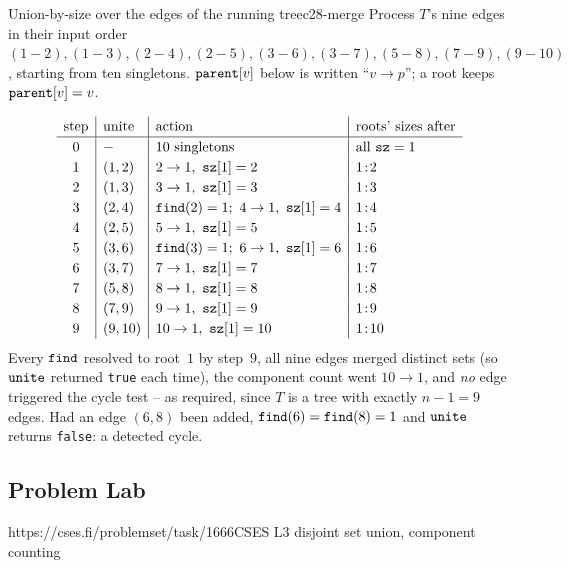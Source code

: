 \begin{example}{Union-by-size over the edges of the running tree}{c28-merge}
Process \(T\)'s nine edges in their input order
\((1\!-\!2),(1\!-\!3),(2\!-\!4),(2\!-\!5),(3\!-\!6),(3\!-\!7),(5\!-\!8),
(7\!-\!9),(9\!-\!10)\), starting from ten singletons.  \(\texttt{parent}[v]\)
below is written ``\(v\!\to\!p\)''; a root keeps \(\texttt{parent}[v]=v\).
\end{example}
\begin{tracebox}
\[
\renewcommand{\arraystretch}{1.2}
\begin{array}{c|l|l|l}
\text{step} & \text{unite} & \text{action} & \text{roots' sizes after} \\ \hline
0 & - & 10\text{ singletons} & \text{all } \code{sz}=1\\
1 & (1,2) & 2\to1,\ \code{sz}[1]=2 & 1\!:\!2\\
2 & (1,3) & 3\to1,\ \code{sz}[1]=3 & 1\!:\!3\\
3 & (2,4) & \code{find}(2)=1;\ 4\to1,\ \code{sz}[1]=4 & 1\!:\!4\\
4 & (2,5) & 5\to1,\ \code{sz}[1]=5 & 1\!:\!5\\
5 & (3,6) & \code{find}(3)=1;\ 6\to1,\ \code{sz}[1]=6 & 1\!:\!6\\
6 & (3,7) & 7\to1,\ \code{sz}[1]=7 & 1\!:\!7\\
7 & (5,8) & 8\to1,\ \code{sz}[1]=8 & 1\!:\!8\\
8 & (7,9) & 9\to1,\ \code{sz}[1]=9 & 1\!:\!9\\
9 & (9,10) & 10\to1,\ \code{sz}[1]=10 & 1\!:\!10
\end{array}
\]
Every \(\texttt{find}\) resolved to root~\(1\) by step~9, all nine edges merged
distinct sets (so \(\texttt{unite}\) returned \texttt{true} each time), the
component count went \(10\to1\), and \emph{no} edge triggered the cycle test
-- as required, since \(T\) is a tree with exactly \(n-1=9\) edges.  Had an
edge \((6,8)\) been added, \(\texttt{find}(6)=\texttt{find}(8)=1\) and
\(\texttt{unite}\) returns \texttt{false}: a detected cycle.
\end{tracebox}

\subsection{Problem Lab}

  {https://cses.fi/problemset/task/1666}{CSES L3}
  {disjoint set union, component counting}

